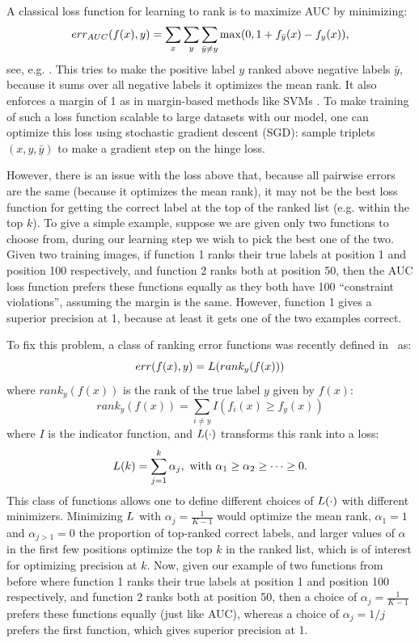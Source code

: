 A classical loss function for learning to rank is to maximize AUC by minimizing:
\[
 err_{AUC}(f(x), y)  = \sum_x \sum_y \sum_{{\bar{y}} \neq y} \max(0,1+ f_{{\bar{y}}}(x) - f_y(x)),
\]
see, e.g.  \citep{herbrich2000large}.
This tries to make the positive label $y$ ranked above negative labels $\bar{y}$, because it sums
over all negative labels it optimizes the mean rank. It also enforces a margin of 1 as in margin-based 
methods like  SVMs \citep{svm}.
To make training of such a loss function scalable to large datasets 
with our model, one can optimize this loss using
 stochastic gradient descent (SGD):
sample triplets $(x, y, \bar{y})$ to make a gradient step on the hinge loss.

However, there is an issue with the loss above that, because all pairwise errors are the same 
(because it optimizes the mean rank), it may 
not be the best loss function for getting the correct label at the top of the ranked list (e.g. within the
top $k$). To give a simple example, 
suppose we are given only two functions to choose from, during our learning step we wish to  
pick the best one of the two.
Given two training images, if function 1 ranks their true labels at
position 1 and position 100 respectively, and function 2 ranks both at
position 50, then the AUC loss function prefers 
these functions equally as they both have 100 ``constraint violations'', 
assuming the margin is the same.
However, function 1 gives a superior precision at 1, because at least it gets one of the two examples correct.

To fix this problem, a class of ranking error functions was recently 
defined in~\citep{usunier:icml2009} as:
\begin{equation} \label{err-eq-orig}
err(f(x),y)  =  {L}(rank_y(f(x)))
\end{equation}
where $rank_y(f(x))$ is the rank of the true label $y$ given by $f(x)$:
\begin{equation*}
rank_y(f(x)) =  \sum_{i \neq y}  I( f_i(x) \geq f_y(x) )
\end{equation*}
where $I$ is the indicator function, 
and ${L}(\cdot)$ transforms this rank into a loss:
\begin{equation}
\label{def:lphi}
{L}(k)  =  \sum_{j=1}^k \alpha_j, \text{~with~} \alpha_1 \geq
\alpha_2\geq \dots \geq 0.
\end{equation}
This class of functions allows one to define different choices of ${L}(\cdot)$
with different minimizers. Minimizing ${L}$ with
$\alpha_j=\frac{1}{K-1}$ would optimize the mean rank, $\alpha_1=1$
and $\alpha_{j>1}=0$ the proportion of top-ranked correct
labels, and larger values of $\alpha$ in the first few positions optimize
the top $k$ in the ranked list, which is of interest for optimizing
precision at $k$. 
Now, given our example of two functions from before
where function 1 ranks their true labels at
position 1 and position 100 respectively, and function 2 ranks both at
position 50, then a choice of $\alpha_j=\frac{1}{K-1}$ prefers
these functions equally (just like AUC), whereas a choice of $\alpha_j=1/j$ prefers
the first function, which gives superior precision at 1.  

